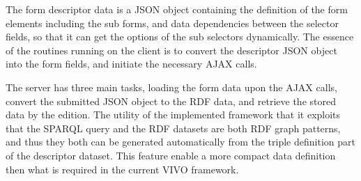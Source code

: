 
The form descriptor data is a JSON object containing the definition of the form elements including the sub forms, and data dependencies between the selector fields, so that it can get the options of the sub selectors dynamically. The essence of the routines running on the client is to convert the descriptor JSON object into the form fields, and initiate the necessary AJAX calls.

The server has three main tasks, loading the form data upon the AJAX calls, convert the submitted JSON object to the RDF data, and retrieve the stored data by the edition. The utility of the implemented framework that it exploits that the SPARQL query and the RDF datasets are both RDF graph patterns, and thus they both can be generated automatically from the triple definition part of the descriptor dataset. This feature enable a more compact data definition then what is required in the current VIVO framework.

